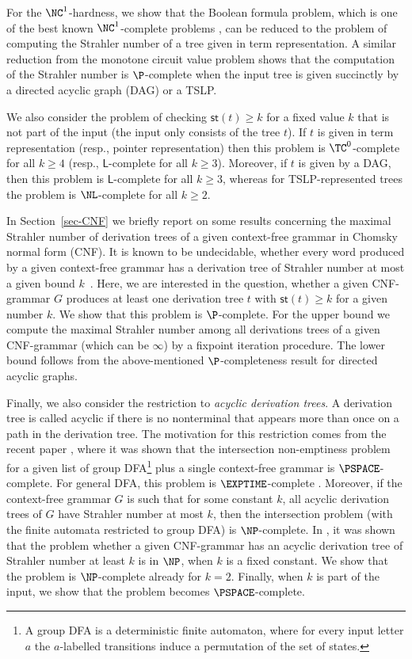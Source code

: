 \documentclass[a4paper,UKenglish,cleveref, autoref, thm-restate, numberwithinsect]{lipics-v2021}
\newcommand{\hs}{\mathsf{st}}
\newcommand{\LS}{\mathsf{L}}
\begin{document}
For the $\NC^1$-hardness, we show that the Boolean formula
problem, which is one of the best known $\NC^1$-complete problems \cite{Bus87}, 
can be reduced to the problem of computing the Strahler number of
a tree given in term representation. A similar reduction from the monotone circuit value problem shows that the computation of the Strahler number is $\P$-complete
when the input tree is given succinctly by a directed acyclic graph (DAG) or a TSLP. 

We also consider the problem of checking $\hs(t) \geq k$ for a fixed value $k$ that is not part
of the input (the input only consists of the tree $t$). If $t$ is given in term representation (resp., pointer representation) then this problem is $\TC^0$-complete for all $k \geq 4$ (resp.,
$\LS$-complete for all $k \geq 3$). Moreover, if $t$ is given by a DAG, then this problem is $\LS$-complete for all $k \ge 3$, whereas for TSLP-represented trees the problem is $\NL$-complete for all $k \geq 2$.

In Section~\ref{sec-CNF}  we briefly report on some results concerning the maximal Strahler number of derivation trees of a given context-free grammar in Chomsky normal form (CNF). It is known to be undecidable, 
whether every word produced by a given context-free grammar has a derivation tree 
of Strahler number at most a given bound $k$~\cite[Theorem~5]{Gruska71b}. Here, we are interested in the question, whether a given CNF-grammar $G$ produces at least one derivation tree $t$
with $\hs(t) \geq k$ for a given number $k$. We show that this problem is $\P$-complete. 
For the upper  bound we compute
the maximal Strahler number among all derivations trees of a given CNF-grammar (which can be $\infty$) by a fixpoint iteration procedure. 
The lower bound follows from the above-mentioned $\P$-completeness result for directed acyclic graphs.

Finally, we also consider the restriction to \emph{acyclic derivation trees}.
A derivation tree is called acyclic if there is no nonterminal that appears more than once on a path in the derivation tree.
The motivation for this restriction comes from the recent paper \cite{LRZ25}, where it was shown that the intersection non-emptiness
problem for a given list of group DFA\footnote{A group DFA is a deterministic finite automaton, where for every input letter $a$
the $a$-labelled transitions induce a permutation of the set of states.} 
 plus a single context-free grammar is $\PSPACE$-complete. For general DFA, this problem is $\EXPTIME$-complete \cite{SwernofskyW15}.
 Moreover, if the context-free grammar $G$ is such that for some constant $k$, all acyclic derivation trees of $G$ have 
 Strahler number at most $k$, then the intersection problem (with the finite automata restricted to group DFA) is $\NP$-complete.
 In \cite{ LRZ25}, it was shown that the problem whether a given CNF-grammar has an acyclic derivation tree of Strahler number at least $k$ is in $\NP$, when $k$ is a fixed constant. We show that the problem is $\NP$-complete already for $k=2$.
 Finally, when $k$ is part of the input, we show that the problem becomes $\PSPACE$-complete.
  
\end{document}
